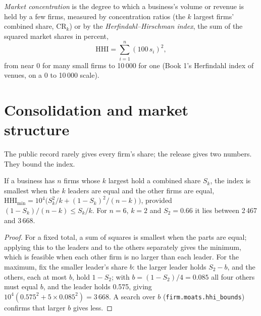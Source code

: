\begin{definition}\label{def:fm:competition-and-the-future:hhi}
\emph{Market concentration} is the degree to which a business's volume or revenue is held by a few firms, measured by
concentration ratios (the $k$ largest firms' combined share, $\mathrm{CR}_k$) or by the \emph{Herfindahl--Hirschman index}, the sum of the squared market shares in percent,
\[ \mathrm{HHI}=\sum_{i=1}^n(100\,s_i)^2, \]
from near 0 for many small firms to 10\,000 for one (Book 1's Herfindahl index of venues, on a 0 to 10\,000 scale).
\end{definition}

\section{Consolidation and market structure}

The public record rarely gives every firm's share; the release gives two numbers. They bound the index.

\begin{proposition}\label{prop:fm:competition-and-the-future:bounds}
If a business has $n$ firms whose $k$ largest hold a combined share $S_k$, the index is smallest when the $k$ leaders are equal and the other firms
are equal, $\mathrm{HHI}_{\min}=10^4\bigl(S_k^2/k+(1-S_k)^2/(n-k)\bigr)$, provided $(1-S_k)/(n-k)\le S_k/k$. For $n=6$, $k=2$ and $S_2=0.66$ it
lies between 2\,467 and 3\,668.
\end{proposition}

\begin{proof}
For a fixed total, a sum of squares is smallest when the parts are equal; applying this to the leaders and to the others separately gives the
minimum, which is feasible when each other firm is no larger than each leader. For the maximum, fix the smaller leader's share $b$: the larger
leader holds $S_2-b$, and the others, each at most $b$, hold $1-S_2$; with $b=(1-S_2)/4=0.085$ all four others must equal $b$, and the leader
holds 0.575, giving $10^4(0.575^2+5\times0.085^2)=3\,668$. A search over $b$ (\texttt{firm.moats.hhi\_bounds}) confirms that larger $b$ gives less.
\end{proof}

